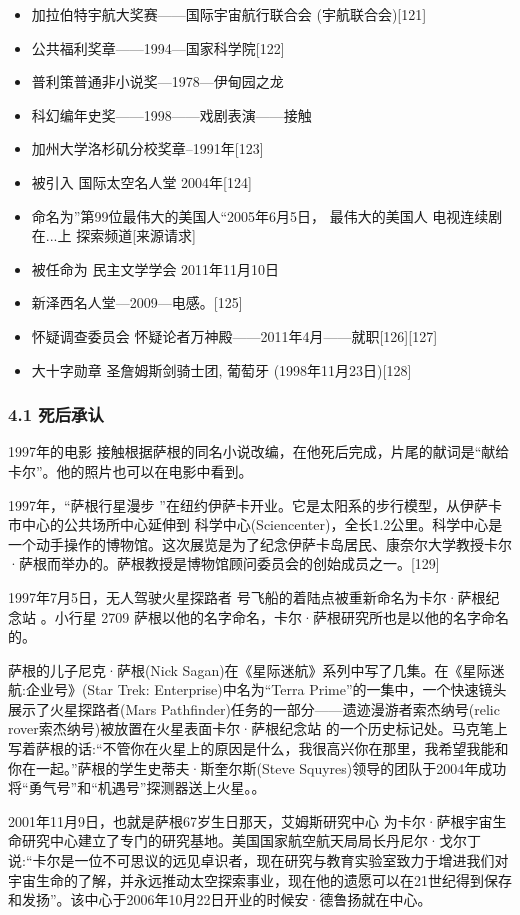 \begin{itemize}
\item 加拉伯特宇航大奖赛——国际宇宙航行联合会 (宇航联合会)[121]
\item 公共福利奖章——1994—国家科学院[122]
\item 普利策普通非小说奖—1978—伊甸园之龙
\item 科幻编年史奖——1998——戏剧表演——接触
\item 加州大学洛杉矶分校奖章–1991年[123]
\item 被引入 国际太空名人堂 2004年[124]
\item 命名为”第99位最伟大的美国人“2005年6月5日， 最伟大的美国人 电视连续剧 在...上 探索频道[来源请求]
\item 被任命为 民主文学学会 2011年11月10日
\item 新泽西名人堂—2009—电感。[125]
\item 怀疑调查委员会 怀疑论者万神殿——2011年4月——就职[126][127]
\item 大十字勋章 圣詹姆斯剑骑士团, 葡萄牙 (1998年11月23日)[128]
\end{itemize}
\subsubsection{4.1 死后承认}
1997年的电影 接触根据萨根的同名小说改编，在他死后完成，片尾的献词是“献给卡尔”。他的照片也可以在电影中看到。

1997年，“萨根行星漫步 ”在纽约伊萨卡开业。它是太阳系的步行模型，从伊萨卡市中心的公共场所中心延伸到 科学中心(Sciencenter)，全长1.2公里。科学中心是一个动手操作的博物馆。这次展览是为了纪念伊萨卡岛居民、康奈尔大学教授卡尔·萨根而举办的。萨根教授是博物馆顾问委员会的创始成员之一。[129]

1997年7月5日，无人驾驶火星探路者 号飞船的着陆点被重新命名为卡尔·萨根纪念站 。小行星 2709 萨根以他的名字命名，卡尔·萨根研究所也是以他的名字命名的。

萨根的儿子尼克·萨根(Nick Sagan)在《星际迷航》系列中写了几集。在《星际迷航:企业号》(Star Trek: Enterprise)中名为“Terra Prime”的一集中，一个快速镜头展示了火星探路者(Mars Pathfinder)任务的一部分——遗迹漫游者索杰纳号(relic rover索杰纳号)被放置在火星表面卡尔·萨根纪念站 的一个历史标记处。马克笔上写着萨根的话:“不管你在火星上的原因是什么，我很高兴你在那里，我希望我能和你在一起。”萨根的学生史蒂夫·斯奎尔斯(Steve Squyres)领导的团队于2004年成功将“勇气号”和“机遇号”探测器送上火星。。

2001年11月9日，也就是萨根67岁生日那天，艾姆斯研究中心 为卡尔·萨根宇宙生命研究中心建立了专门的研究基地。美国国家航空航天局局长丹尼尔·戈尔丁说:“卡尔是一位不可思议的远见卓识者，现在研究与教育实验室致力于增进我们对宇宙生命的了解，并永远推动太空探索事业，现在他的遗愿可以在21世纪得到保存和发扬”。该中心于2006年10月22日开业的时候安·德鲁扬就在中心。

